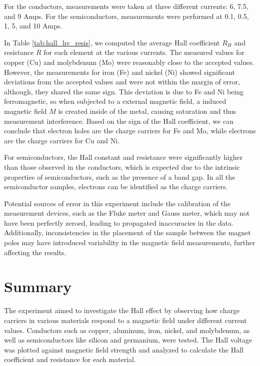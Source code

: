 \documentclass[a4paper,12pt,english]{all-in-one} %
\begin{document}
\begin{multicols}{2}
{For the conductors, measurements were taken at three different currents: 6, 7.5, and 9 Amps. For the semiconductors, measurements were performed at 0.1, 0.5, 1, 5, and 10 Amps.

In Table \ref{tab:hall_hv_resis}, we computed the average Hall coefficient $R_H$ and resistance $R$ for each element at the various currents. The measured values for copper (Cu) and molybdenum (Mo) were reasonably close to the accepted values. However, the measurements for iron (Fe) and nickel (Ni) showed significant deviations from the accepted values and were not within the margin of error, although, they shared the same sign. This deviation is due to Fe and Ni being ferromagnetic, so when subjected to a external magnetic field, a induced magnetic field $M$ is created inside of the metal, causing saturation and thus measurement interference. Based on the sign of the Hall coefficient, we can conclude that electron holes are the charge carriers for Fe and Mo, while electrons are the charge carriers for Cu and Ni.

For semiconductors, the Hall constant and resistance were significantly higher than those observed in the conductors, which is expected due to the intrinsic properties of semiconductors, such as the presence of a band gap. In all the semiconductor samples, electrons can be identified as the charge carriers.

Potential sources of error in this experiment include the calibration of the measurement devices, such as the Fluke meter and Gauss meter, which may not have been perfectly zeroed, leading to propagated inaccuracies in the data. Additionally, inconsistencies in the placement of the sample between the magnet poles may have introduced variability in the magnetic field measurements, further affecting the results.


}

\end{multicols}

\section*{Summary}
{
The experiment aimed to investigate the Hall effect by observing how charge carriers in various materials respond to a magnetic field under different current values. Conductors such as copper, aluminum, iron, nickel, and molybdenum, as well as semiconductors like silicon and germanium, were tested. The Hall voltage was plotted against magnetic field strength and analyzed to calculate the Hall coefficient and resistance for each material. 
}
\end{document}
